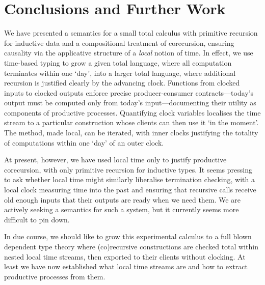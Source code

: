 \section{Conclusions and Further Work}
\label{sec:conclusions}

We have presented a semantics for a small total calculus with
primitive recursion for inductive data and a compositional treatment
of corecursion, ensuring causality via the applicative structure of a
\emph{local} notion of time. In effect, we use time-based typing to
grow a given total language, where all computation terminates within
one `day', into a larger total language, where additional recursion is
justified clearly by the advancing clock. Functions from clocked
inputs to clocked outputs enforce precise producer-consumer
contracts---today's output must be computed only from today's
input---documenting their utility as components of productive
processes. Quantifying clock variables localises the time stream to a
particular construction whose clients can then use it `in the moment'.
The method, made local, can be iterated, with inner clocks justifying
the totality of computations within one `day' of an outer clock.

At present, however, we have used local time only to justify
productive corecursion, with only primitive recursion for inductive
types. It seems pressing to ask whether local time might similarly
liberalise termination checking, with a local clock measuring time into
the past and ensuring that recursive calls receive old enough inputs
that their outputs are ready when we need them. We are actively
seeking a semantics for such a system, but it currently seems more
difficult to pin down.

In due course, we should like to grow this experimental calculus to a
full blown dependent type theory where (co)recursive constructions are
checked total within nested local time streams, then exported to their
clients without clocking. At least we have now established what local
time streams are and how to extract productive processes from them.


